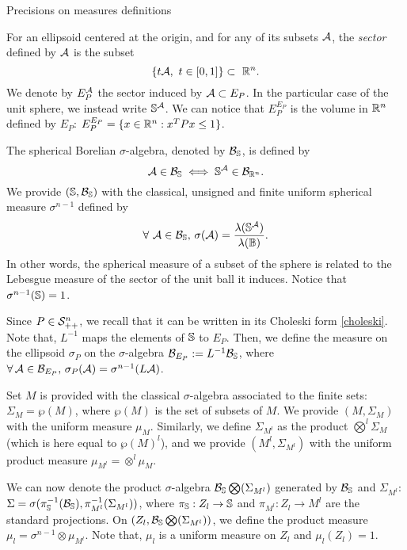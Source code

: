 \begin{section}{Precisions on measures definitions}

For an ellipsoid centered at the origin, and for any of its subsets $\mathcal{A}$, the \emph{sector} defined by $\mathcal{A}$ is the subset $$\{t \calA, \ t \in [0,1]\} \subset\ \R^n.$$ We denote by $E_P^{\mathcal{A}}$ the sector induced by $\mathcal{A} \subset E_P$. In the particular case of the unit sphere, we instead write $\mathbb{S}^{\mathcal{A}}$. We can notice that $E_P^{E_P}$ is the volume in $\mathbb{R}^n$ defined by $E_P$: $E_P^{E_P} = \{x \in \mathbb{R}^n: x^TPx \leq 1\}$.

The spherical Borelian $\sigma$-algebra, denoted by $\mathcal{B}_{\mathbb{S}}$, is defined by $$\mathcal{A} \in \mathcal{B}_{\mathbb{S}} \iff \mathbb{S}^{\mathcal{A}} \in \mathcal{B}_{\mathbb{R}^n}.$$ We provide $(\mathbb{S},\mathcal{B}_{\mathbb{S}})$ with the classical, unsigned and finite uniform spherical measure $\sigma^{n-1}$ defined by
$$\forall\ \mathcal{A} \in \mathcal{B}_{\mathbb{S}},\, \sigma(\mathcal{A}) = \frac{\lambda(\mathbb{S}^{\mathcal{A}})}{\lambda(\mathbb{B})}. $$
In other words, the spherical measure of a subset of the sphere is related to the Lebesgue measure of the sector of the unit ball it induces. Notice that $\sigma^{n-1}(\mathbb{S}) = 1$.

Since $P \in \mathcal{S}_{++}^n$, we recall that it can be written in its Choleski form \eqref{choleski}. Note that, $L^{-1}$ maps the elements of $\mathbb{S}$ to $E_P$. Then, we define the measure on the ellipsoid $\sigma_P$ on the $\sigma$-algebra $\mathcal{B}_{E_P}:=L^{-1}\mathcal{B}_{\mathbb{S}}$, where $\forall\, \mathcal{A} \in \mathcal{B}_{E_P},\, \sigma_P({\mathcal{A}}) = \sigma^{n-1}(L\mathcal{A})$. 

Set $M$ is provided with the classical $\sigma$-algebra associated to the finite sets: $\Sigma_M = \wp(M)$, where $\wp(M)$ is the set of subsets of $M$. We provide $(M, \Sigma_M)$ with the uniform measure $\mu_M$. Similarly, we define $\Sigma_{M^l}$ as the product $\bigotimes^l \Sigma_M$ (which is here equal to $\wp(M)^l$), and we provide $(M^l, \Sigma_{M^l})$ with the uniform product measure $\mu_{M^l} = \otimes^l \mu_M$.

We can now denote the product $\sigma$-algebra $\mathcal{B}_{\mathbb{S}} \bigotimes (\Sigma_{M^l})$ generated by $\mathcal{B}_{\mathbb{S}}$ and $\Sigma_{M^l}$: $\Sigma = \sigma( \pi_{\mathbb{S}}^{-1}(\mathcal{B}_{\mathbb{S}}),  \pi_{M^l}^{-1}(\Sigma_{M^l}))$, where $\pi_{\mathbb{S}}: Z_l \to \mathbb{S}$ and $\pi_{M^l}: Z_l \to M^l$ are the standard projections. On $(Z_l,\mathcal{B}_{\mathbb{S}} \bigotimes (\Sigma_{M^l}) )$, we define the product measure $\mu_l = \sigma^{n-1} \otimes \mu_{M^l}$. Note that, $\mu_l$ is a uniform measure on $Z_l$ and $\mu_l(Z_l)=1$.  

\end{section}